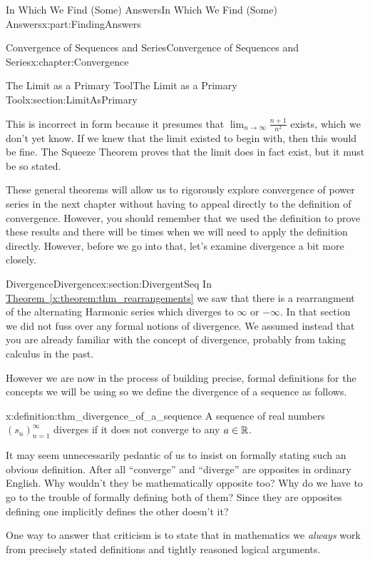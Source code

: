 \begin{partptx}{In Which We Find (Some) Answers}{}{In Which We Find (Some) Answers}{}{}{x:part:FindingAnswers}
\begin{chapterptx}{Convergence of Sequences and Series}{}{Convergence of Sequences and Series}{}{}{x:chapter:Convergence}
\begin{sectionptx}{The Limit as a Primary Tool}{}{The Limit as a Primary Tool}{}{}{x:section:LimitAsPrimary}
			\par
			This is incorrect in form because it presumes that \(\lim_{n\rightarrow\infty}\frac{n+1}{n^2}\) exists, which we don't yet know. If we knew that the limit existed to begin with, then this would be fine. The Squeeze Theorem proves that the limit does in fact exist, but it must be so stated.%
			\par
			These general theorems will allow us to rigorously explore convergence of power series in the next chapter without having to appeal directly to the definition of convergence. However, you should remember that we used the definition to prove these results and there will be times when we will need to apply the definition directly. However, before we go into that, let's examine divergence a bit more closely.%
		\end{sectionptx}
		\typeout{************************************************}
		\typeout{************************************************}
		\begin{sectionptx}{Divergence}{}{Divergence}{}{}{x:section:DivergentSeq}
			In \hyperref[x:theorem:thm_rearrangements]{Theorem~{\xreffont\ref{x:theorem:thm_rearrangements}}} we saw that there is a rearrangment of the alternating Harmonic series which diverges to \(\infty\) or \(-\infty\). In that section we did not fuss over any formal notions of divergence. We assumed instead that you are already familiar with the concept of divergence, probably from taking calculus in the past.%
			\par
			However we are now in the process of building precise, formal definitions for the concepts we will be using so we define the divergence of a sequence as follows.%
			\begin{definition}{}{x:definition:thm_divergence_of_a_sequence}%
				 A sequence of real numbers \(\left(s_n\right)_{n=1}^\infty\) diverges if it does not converge to any \(a\in\mathbb {R}\).%
			\end{definition}
			It may seem unnecessarily pedantic of us to insist on formally stating such an obvious definition. After all ``converge'' and ``diverge'' are opposites in ordinary English. Why wouldn't they be mathematically opposite too? Why do we have to go to the trouble of formally defining both of them? Since they are opposites defining one implicitly defines the other doesn't it?%
			\par
			One way to answer that criticism is to state that in mathematics we \emph{always} work from precisely stated definitions and tightly reasoned logical arguments.%

\end{sectionptx}
\end{chapterptx}
\end{partptx}
